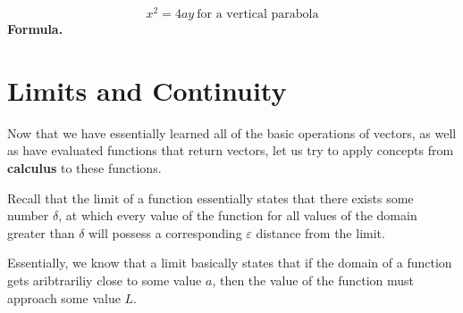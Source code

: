 \documentclass{report}
\begin{document}
\begin{sloppypar}
\begin{center}
{{      \[ x^{2} = 4ay ~ \textrm{for a vertical parabola}\]
      \textbf{Formula.}
    }
  }
\end{center}

\section{Limits and Continuity}
Now that we have essentially learned all
of the basic operations of vectors,
as well as have evaluated functions
that return vectors, let us try to
apply concepts from \textbf{calculus}
to these functions.
\par Recall that the limit of a function
essentially states that there exists
some number $ \delta $, at which
every value of the function for
all values of the domain greater than
$ \delta $ will possess a corresponding
$ \varepsilon $ distance from the limit.
\par Essentially, we know that a limit
basically states that if the domain
of a function gets aribtrariliy close
to some value $ a $, then the value of the
function must approach some value $ L $.

\begin{center}
\end{center}

\begin{center}
\end{center}

\begin{center}
\end{center}


\end{sloppypar}
\end{document}
